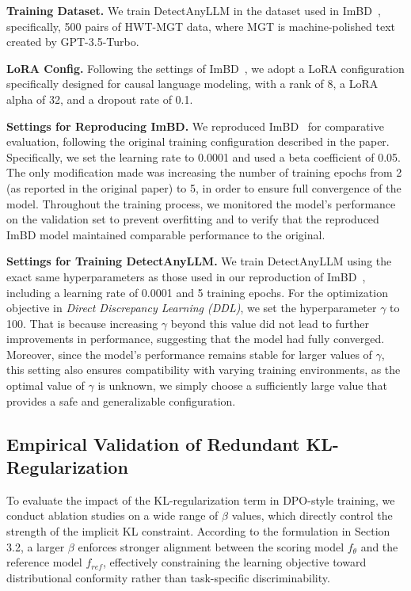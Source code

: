 \documentclass[sigconf, screen, review, anonymous]{acmart}
\begin{document}
\noindent \textbf{Training Dataset. }
We train DetectAnyLLM in the dataset used in ImBD~\cite{imbd}, specifically, 500 pairs of HWT-MGT data, where MGT is machine-polished text created by GPT-3.5-Turbo.

\noindent \textbf{LoRA Config. }
Following the settings of ImBD~\cite{imbd}, we adopt a LoRA configuration specifically designed for causal language modeling, with a rank of 8, a LoRA alpha of 32, and a dropout rate of 0.1.

\noindent \textbf{Settings for Reproducing ImBD. }
We reproduced ImBD~\cite{imbd} for comparative evaluation, following the original training configuration described in the paper.
%
Specifically, we set the learning rate to 0.0001 and used a beta coefficient of 0.05.
%
The only modification made was increasing the number of training epochs from 2 (as reported in the original paper) to 5, in order to ensure full convergence of the model.
%
Throughout the training process, we monitored the model's performance on the validation set to prevent overfitting and to verify that the reproduced ImBD model maintained comparable performance to the original.

\noindent \textbf{Settings for Training DetectAnyLLM. }
We train DetectAnyLLM using the exact same hyperparameters as those used in our reproduction of ImBD~\cite{imbd}, including a learning rate of 0.0001 and 5 training epochs.
%
For the optimization objective in \textit{Direct Discrepancy Learning (DDL)}, we set the hyperparameter $\gamma$ to 100.
%
That is because increasing $\gamma$ beyond this value did not lead to further improvements in performance, suggesting that the model had fully converged.
%
Moreover, since the model's performance remains stable for larger values of $\gamma$, this setting also ensures compatibility with varying training environments, as the optimal value of $\gamma$ is unknown, we simply choose a sufficiently large value that provides a safe and generalizable configuration.


\subsection{Empirical Validation of Redundant KL-Regularization}
To evaluate the impact of the KL-regularization term in DPO-style training, we conduct ablation studies on a wide range of $\beta$ values, which directly control the strength of the implicit KL constraint. According to the formulation in Section 3.2, a larger $\beta$ enforces stronger alignment between the scoring model $f_\theta$ and the reference model $f_{ref}$, effectively constraining the learning objective toward distributional conformity rather than task-specific discriminability. 
\end{document}
